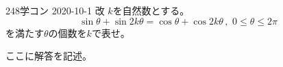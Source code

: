 \begin{thm}{248}{}{学コン 2020-10-1 改}
 $k$を自然数とする。
 \[ \sin\theta+\sin 2k\theta=\cos\theta+\cos 2k\theta \,,\,\, 0\le\theta\le 2\pi \]
 を満たす$\theta$の個数を$k$で表せ。
\end{thm}

ここに解答を記述。